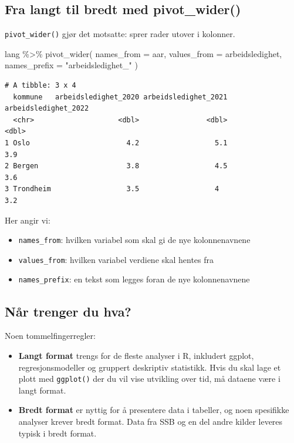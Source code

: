 \documentclass[
  norsk,
  letterpaper,
  DIV=11,
  numbers=noendperiod]{scrreprt}
\newenvironment{Shaded}{\begin{snugshade}}{\end{snugshade}}
\newcommand{\AttributeTok}[1]{\textcolor[rgb]{0.40,0.45,0.13}{#1}}
\newcommand{\FunctionTok}[1]{\textcolor[rgb]{0.28,0.35,0.67}{#1}}
\newcommand{\NormalTok}[1]{\textcolor[rgb]{0.00,0.23,0.31}{#1}}
\newcommand{\SpecialCharTok}[1]{\textcolor[rgb]{0.37,0.37,0.37}{#1}}
\newcommand{\StringTok}[1]{\textcolor[rgb]{0.13,0.47,0.30}{#1}}
\providecommand{\tightlist}{%
  \setlength{\itemsep}{0pt}\setlength{\parskip}{0pt}}
\theoremstyle{definition}
\theoremstyle{remark}
\begin{document}
\subsection{Fra langt til bredt med
pivot\_wider()}\label{fra-langt-til-bredt-med-pivot_wider}

\texttt{pivot\_wider()} gjør det motsatte: sprer rader utover i
kolonner.

\begin{Shaded}
\begin{Highlighting}[]
\NormalTok{lang }\SpecialCharTok{\%\textgreater{}\%}
  \FunctionTok{pivot\_wider}\NormalTok{(}
    \AttributeTok{names\_from =}\NormalTok{ aar,}
    \AttributeTok{values\_from =}\NormalTok{ arbeidsledighet,}
    \AttributeTok{names\_prefix =} \StringTok{"arbeidsledighet\_"}
\NormalTok{  )}
\end{Highlighting}
\end{Shaded}

\begin{verbatim}
# A tibble: 3 x 4
  kommune   arbeidsledighet_2020 arbeidsledighet_2021 arbeidsledighet_2022
  <chr>                    <dbl>                <dbl>                <dbl>
1 Oslo                       4.2                  5.1                  3.9
2 Bergen                     3.8                  4.5                  3.6
3 Trondheim                  3.5                  4                    3.2
\end{verbatim}

Her angir vi:

\begin{itemize}
\tightlist
\item
  \texttt{names\_from}: hvilken variabel som skal gi de nye
  kolonnenavnene
\item
  \texttt{values\_from}: hvilken variabel verdiene skal hentes fra
\item
  \texttt{names\_prefix}: en tekst som legges foran de nye
  kolonnenavnene
\end{itemize}

\subsection{Når trenger du hva?}\label{nuxe5r-trenger-du-hva}

Noen tommelfingerregler:

\begin{itemize}
\tightlist
\item
  \textbf{Langt format} trengs for de fleste analyser i R, inkludert
  ggplot, regresjonsmodeller og gruppert deskriptiv statistikk. Hvis du
  skal lage et plott med \texttt{ggplot()} der du vil vise utvikling
  over tid, må dataene være i langt format.
\item
  \textbf{Bredt format} er nyttig for å presentere data i tabeller, og
  noen spesifikke analyser krever bredt format. Data fra SSB og en del
  andre kilder leveres typisk i bredt format.
\end{itemize}
\end{document}
